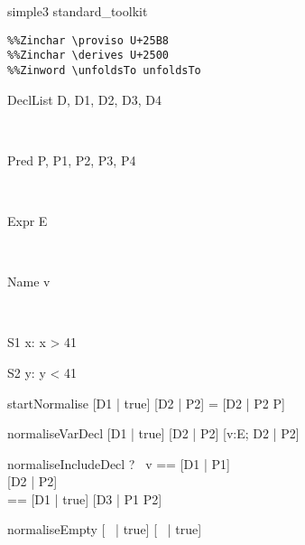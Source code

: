 \begin{zsection}
\SECTION simple3 \parents standard\_toolkit
\end{zsection}

\begin{verbatim}
%%Zinchar \proviso U+25B8
%%Zinchar \derives U+2500
%%Zinword \unfoldsTo unfoldsTo
\end{verbatim}
\newcommand{\unfoldsTo}{\mathrel{\leadsto}}

\begin{zedjoker}{DeclList} D, D1, D2, D3, D4\end{zedjoker} \\
\begin{zedjoker}{Pred} P, P1, P2, P3, P4\end{zedjoker} \\
\begin{zedjoker}{Expr} E\end{zedjoker} \\
\begin{zedjoker}{Name} v\end{zedjoker} \\

\begin{schema}{S1}
  x:\nat
\where
  x > 41
\end{schema}

\begin{schema}{S2}
  y:\nat
\where
  y < 41
\end{schema}

\begin{zedrule}{startNormalise}
   [D1 | true] \unfoldsTo [D2 | P2]
\derives
   [D1 | P] = [D2 | P2 \land P]
\end{zedrule}

\begin{zedrule}{normaliseVarDecl}
   [D1 | true] \unfoldsTo [D2 | P2]
\derives
   [v:E; D1 | true] \unfoldsTo [v:E; D2 | P2]
\end{zedrule}

\begin{zedrule}{normaliseIncludeDecl}
   \proviso ?~ v == [D1 | P1] \\
   [D | true] \unfoldsTo [D2 | P2] \\
   \proviso [D3 | true] == [D1 | true] \schemamerge [D2 | true]
\derives
   [v; D | true] \unfoldsTo [D3 | P1 \land P2]
\end{zedrule}

\begin{zedrule}{normaliseEmpty}
   [~ | true] \unfoldsTo [~ | true]
\end{zedrule}

